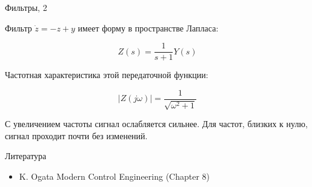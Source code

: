 \documentclass{beamer}
\begin{document}
\begin{frame}{Фильтры, 2}
	\begin{flushleft}
		
		Фильтр $\dot{ z }  = 
		-z+y$ имеет форму в пространстве Лапласа:
		
		\begin{equation}
			Z(s) = \frac{1}{s+1} Y(s)
		\end{equation}
		
		Частотная характеристика этой передаточной функции:
		
		\begin{equation}
			|Z(j\omega)| = \frac{1}{\sqrt{\omega^2 + 1}}
		\end{equation}
		
		С увеличением частоты сигнал ослабляется сильнее. Для частот, близких к нулю, сигнал проходит почти без изменений.
		
	\end{flushleft}
\end{frame}




\begin{frame}{Литература}
	
	\begin{itemize}
		
		\item K. Ogata Modern Control Engineering (Chapter 8)
		
	\end{itemize}
	
\end{frame}

\myqrframe
\end{document}

